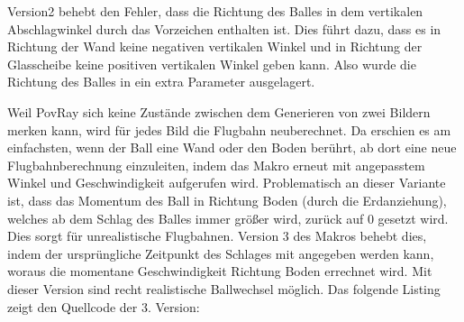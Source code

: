 Version2 behebt den Fehler, dass die Richtung des Balles in dem vertikalen Abschlagwinkel durch das Vorzeichen enthalten ist. Dies führt dazu, dass es in Richtung der Wand keine negativen vertikalen Winkel und in Richtung der Glasscheibe keine positiven vertikalen Winkel geben kann. Also wurde die Richtung des Balles in ein extra Parameter ausgelagert.

Weil PovRay sich keine Zustände zwischen dem Generieren von zwei Bildern merken kann, wird für jedes Bild die Flugbahn neuberechnet. Da erschien es am einfachsten, wenn der Ball eine Wand oder den Boden berührt, ab dort eine neue Flugbahnberechnung einzuleiten, indem das Makro erneut mit angepasstem Winkel und Geschwindigkeit aufgerufen wird. Problematisch an dieser Variante ist, dass das Momentum des Ball in Richtung Boden (durch die Erdanziehung), welches ab dem Schlag des Balles immer größer wird, zurück auf $0$ gesetzt wird. Dies sorgt für unrealistische Flugbahnen. Version 3 des Makros behebt dies, indem der ursprüngliche Zeitpunkt des Schlages mit angegeben werden kann, woraus die momentane Geschwindigkeit Richtung Boden errechnet wird. Mit dieser Version sind recht realistische Ballwechsel möglich. Das folgende Listing zeigt den Quellcode der 3. Version:\\

